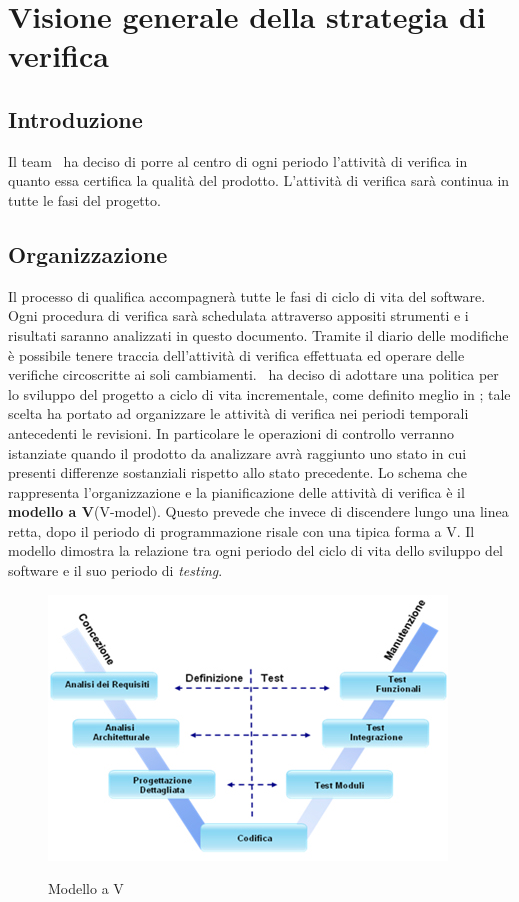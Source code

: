 \section{Visione generale della strategia di verifica}
\subsection{Introduzione}
Il team \gruppo ~ha deciso di porre al centro di ogni periodo l'attività di verifica in quanto essa certifica la qualità del prodotto. L'attività di verifica sarà continua in tutte le fasi del progetto.\\
\subsection{Organizzazione}
Il processo di qualifica accompagnerà tutte le fasi di ciclo di vita del software. Ogni procedura di verifica sarà schedulata attraverso appositi strumenti e i risultati saranno analizzati in questo documento. Tramite il diario delle modifiche è possibile tenere traccia dell'attività di verifica effettuata ed operare delle verifiche circoscritte ai soli cambiamenti.
\gruppo ~ha deciso di adottare una politica per lo sviluppo del progetto a ciclo di vita incrementale, come definito meglio in \infoPDP; tale scelta ha portato ad organizzare le attività di verifica nei periodi temporali antecedenti le revisioni.
In particolare le operazioni di controllo verranno istanziate quando il prodotto da analizzare avrà raggiunto uno stato in cui presenti differenze sostanziali rispetto allo stato precedente.
Lo schema che rappresenta l'organizzazione e la pianificazione delle attività di verifica è il \textbf{modello a V}(V-model). Questo prevede che invece di discendere lungo una linea retta, dopo il periodo di programmazione risale con una tipica forma a V. Il modello dimostra la relazione tra ogni periodo del ciclo di vita dello sviluppo del software e il suo periodo di \textit{testing}.
\begin{figure} [H]
\centering
     \includegraphics[scale=0.8]{../modello/img/V}\\
     \caption{Modello a V}\label{fig:1}
\end{figure}
